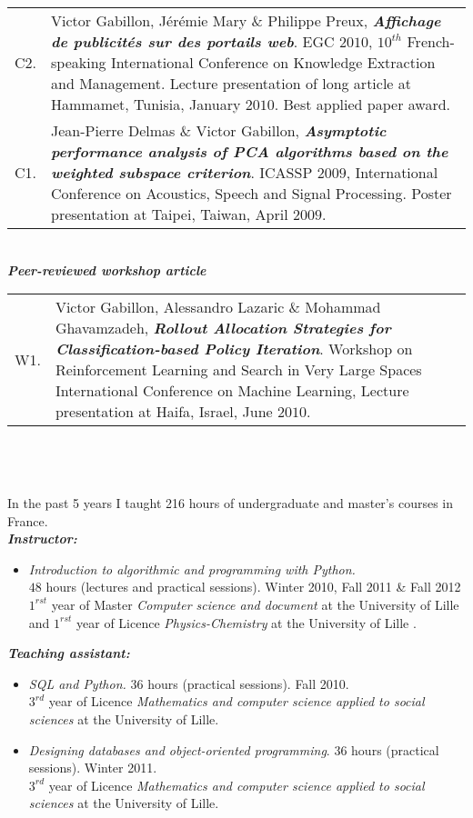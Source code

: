\begin{tabularx}{\columnwidth}{@{} l X @{}}
C2. & Victor Gabillon, Jérémie Mary $\&$ Philippe Preux, \textbf{ \emph{Affichage de publicités sur des portails web}}. EGC $2010$, $10^{th}$ French-speaking International Conference on Knowledge Extraction and Management. Lecture presentation of long article at Hammamet, Tunisia, January $2010$. Best applied paper award.\\

 
C1. & Jean-Pierre Delmas $\&$ Victor Gabillon,\textbf{ \emph{Asymptotic performance analysis of PCA algorithms based on the weighted subspace criterion}}.  ICASSP $2009$, International Conference on Acoustics, Speech and Signal Processing. Poster presentation at Taipei, Taiwan, April $2009$. 
   \end{tabularx}\\

\newpage
\noindent\textit{\textbf{Peer-reviewed workshop article}}\\
\noindent\begin{tabularx}{\columnwidth}{@{} l X @{}}
 W1. & Victor Gabillon,  Alessandro Lazaric $\&$ Mohammad Ghavamzadeh, \textbf{ \emph{Rollout Allocation Strategies for Classification-based Policy Iteration}}. Workshop on Reinforcement Learning and Search in Very Large Spaces International Conference on Machine Learning,  Lecture presentation at Haifa, Israel, June $2010$.
  \end{tabularx}\\
  
  



\noindent{}\\[-.4cm]\noindent\makebox[\linewidth]{\rule{\columnwidth}{0.4pt}}\\[.1cm]
In the past 5 years I taught 216 hours of undergraduate and master's courses in France.\\
\textit{\textbf{Instructor:}} 
 \begin{itemize} 
 \item\textit{Introduction to algorithmic and programming with Python.}\\
    $48$ hours (lectures and practical sessions). Winter 2010, Fall 2011 \& Fall 2012\\
    $1^{rst}$ year of Master \textit{Computer science and document} at the University of Lille  and  $1^{rst}$ year of Licence \textit{Physics-Chemistry} at the University of Lille .
    \end{itemize}
\textit{\textbf{Teaching assistant:}} 
\begin{itemize}
 \item \textit{SQL and Python.} $36$ hours (practical sessions). Fall 2010.\\
    $3^{rd}$ year of Licence \textit{Mathematics and computer science applied to social sciences} at the University of Lille. 
\item \textit{Designing databases and object-oriented programming}.
    $36$ hours (practical sessions). Winter 2011.\\
    $3^{rd}$ year of Licence \textit{Mathematics and computer science applied to social sciences} at the University of Lille. 
\end{itemize}
